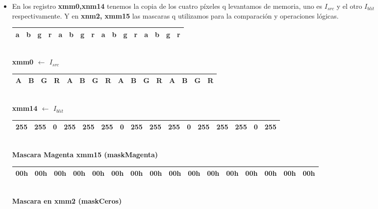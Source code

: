 \begin{itemize}

	\item En los registro \textbf{xmm0,xnm14} tenemos la copia de los cuatro píxeles q levantamos de memoria, uno es $I_{src}$ y el otro $I_{blit}$ respectivamente.
			Y en \textbf{xnm2, xmm15} las mascaras q utilizamos para la comparación y operaciones lógicas.

		\begin{center}
		   \begin{tabular}{| c | c | c | c || c | c | c | c || c | c | c | c || c | c | c | c |}
			 \hline
			 a & b & g & r & a & b & g & r & a & b & g & r & a & b & g & r \\ \hline
		   \end{tabular}
		   \\ \textbf{xmm0 $\gets$ $I_{src}$ }
		\end{center}

		\begin{center}
		   \begin{tabular}{| c | c | c | c || c | c | c | c || c | c | c | c || c | c | c | c |}
			 \hline
			 A & B & G & R & A & B & G & R & A & B & G & R & A & B & G & R \\ \hline
		   \end{tabular}
		   \\ \textbf{xmm14 $\gets$ $I_{blit}$ }
		\end{center}
		
		 
		\begin{center}
		   \begin{tabular}{| c | c | c | c || c | c | c | c || c | c | c | c || c | c | c | c |}
			 \hline
			 255 & 255 & 0 & 255 & 255 & 255 & 0 & 255 & 255 & 255 & 0 & 255 & 255 & 255 & 0 & 255 \\ \hline
		   \end{tabular}
		   \\  \textbf{Mascara Magenta xmm15 (maskMagenta)}
		\end{center}

		\begin{center}
		   \begin{tabular}{| c | c | c | c || c | c | c | c || c | c | c | c || c | c | c | c |}
			 \hline
			 00h & 00h & 00h & 00h & 00h & 00h & 00h & 00h & 00h & 00h & 00h & 00h & 00h & 00h & 00h & 00h \\ \hline
		   \end{tabular}
		   \\ \textbf{Mascara en xmm2 (maskCeros)}
		\end{center}
		

\end{itemize}
